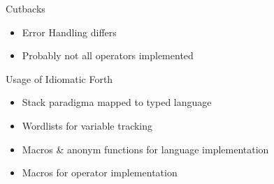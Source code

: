 \documentclass{beamer}
\begin{document}
\begin{frame}
    Cutbacks
    \begin{itemize}
    \item Error Handling differs
    \item Probably not all operators implemented
    \end{itemize}
\end{frame}


\begin{frame}
    Usage of Idiomatic Forth
    \begin{itemize}
    \item Stack paradigma mapped to typed language
    \item Wordlists for variable tracking 
    \item Macros \& anonym functions for language implementation
    \item Macros for operator implementation
    \end{itemize}
\end{frame}
\end{document}
